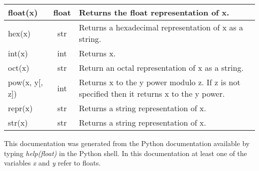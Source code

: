 \begin{center}
{\begin{tabular}{|l|c|p{2.2in}|}
 \\ \hline
 float(x) & float & Returns the float representation of x.
 \\ \hline
 hex(x) & str & Returns a hexadecimal representation of x as a string.
 \\ \hline
 int(x) & int & Returns x.
 \\ \hline 
 oct(x) & str & Return an octal representation of x as a string. 
 \\ \hline 
 pow(x, y[, z]) & int & Returns x to the y power modulo z. If z is not specified then it returns x to the y power. 
 \\ \hline
 repr(x) & str & Returns a string representation of x.
 \\ \hline
 str(x) & str & Returns a string representation of x.
 \\ \hline 
\end{tabular}}
\end{center}

\label{floatmethods}

This documentation was generated from the Python documentation available by typing {\em help(float)} in the Python shell. In this documentation at least one of the variables {\em x} and  {\em y} refer to floats.

